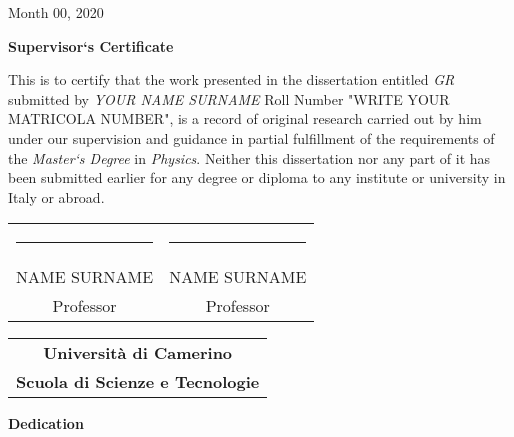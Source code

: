 \documentclass{report}
\begin{document}
\vspace*{0.7cm}
\begin{flushright}
\large{Month 00, 2020}
\end{flushright}

\vspace*{0.7cm}
\begin{center}
\huge{\textbf{Supervisor`s Certificate}}
\end{center}

\vspace*{1cm}
\Large{This is to certify that the work presented in the dissertation entitled \textit{GR} submitted by \textit{YOUR NAME SURNAME} Roll Number "WRITE YOUR MATRICOLA NUMBER", is a record of original research carried out by him under our supervision and guidance in partial fulfillment of the requirements of the \textit{Master`s Degree} in \textit{Physics}. Neither this dissertation nor any part of it has been submitted earlier for any degree or diploma to any institute or university in Italy or abroad.}


\vspace*{0.9cm}
\renewcommand{\arraystretch}{0.5}
\setlength{\tabcolsep}{30pt}
\begin{center}
\begin{tabular}{c c}
\par\noindent\rule{6cm}{0.5pt} & \par\noindent\rule{6cm}{0.5pt}\\
\LARGE{NAME SURNAME} & \LARGE{NAME SURNAME}\\
\Large{Professor}  & \Large{Professor}
\end{tabular}
\end{center}

\vspace*{3cm}
\begin{center}
\renewcommand{\arraystretch}{0.5}
\begin{tabular}[t] {c}

\huge{\textbf{Universit\`{a} di Camerino}} \\
\LARGE\textbf{Scuola di Scienze e Tecnologie}
\end{tabular}
\end{center}


\newpage
\thispagestyle{empty}
\vspace*{3cm}

\begin{center}
\Huge{\textbf{Dedication}}
\end{center}
\end{document}
